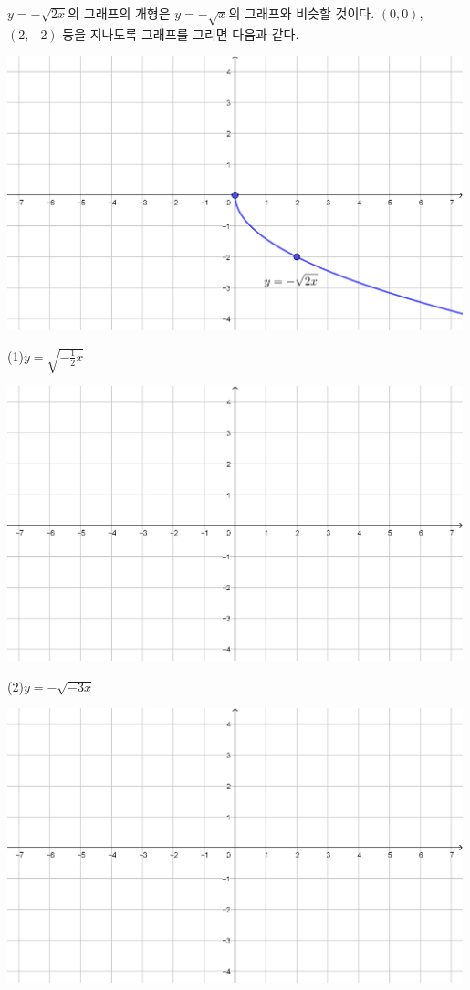 \documentclass{oblivoir}
\begin{document}
\newpage
%
\label{irrational3}
\begin{mdframed}
\(y=-\sqrt{2x}\)의 그래프의 개형은 \(y=-\sqrt x\)의 그래프와 비슷할 것이다.
\((0,0)\), \((2,-2)\) 등을 지나도록 그래프를 그리면 다음과 같다.
\begin{center}
\includegraphics[width=0.99\textwidth]{irrational_3}
\end{center}
\end{mdframed}

%
\label{irrational4}
(1)\:\:\(y=\sqrt{-\frac12x}\)
\begin{center}
\includegraphics[width=0.99\textwidth]{74grid}
\end{center}
\newpage
(2)\:\:\(y=-\sqrt{-3x}\)
\begin{center}
\includegraphics[width=0.99\textwidth]{74grid}
\end{center}
\end{document}
